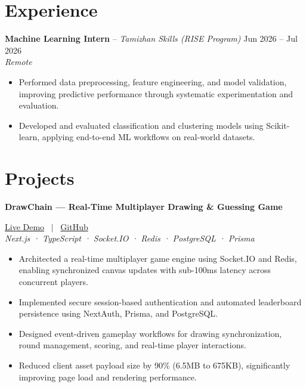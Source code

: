 \documentclass[10pt, a4paper]{article}
\begin{document}

\section{Experience}

\noindent \textbf{Machine Learning Intern} -- \textit{Tamizhan Skills (RISE Program)} \hfill Jun 2026 -- Jul 2026 \\
\textit{\small{Remote}} \\
\begin{itemize}

    \item Performed data preprocessing, feature engineering, and model validation, improving predictive performance through systematic experimentation and evaluation.

    \item Developed and evaluated classification and clustering models using Scikit-learn, applying end-to-end ML workflows on real-world datasets.

\end{itemize}
\vspace{2pt}



\section{Projects}

\noindent \textbf{DrawChain --- Real-Time Multiplayer Drawing \& Guessing Game} \hfill 

\small{
\href{https://drawchain.logiclane.online/}{Live Demo}
 \ $|$ \ \href{https://github.com/PankajKumar-11/DrawChain-}{GitHub}
}
 \\
\textit{\small{Next.js · TypeScript · Socket.IO · Redis · PostgreSQL · Prisma}}
\begin{itemize}

    \item Architected a real-time multiplayer game engine using Socket.IO and Redis, enabling synchronized canvas updates with sub-100ms latency across concurrent players.

    \item Implemented secure session-based authentication and automated leaderboard persistence using NextAuth, Prisma, and PostgreSQL.

    \item Designed event-driven gameplay workflows for drawing synchronization, round management, scoring, and real-time player interactions.

    \item Reduced client asset payload size by 90\% (6.5MB to 675KB), significantly improving page load and rendering performance.

\end{itemize}
\vspace{3pt}
\end{document}
